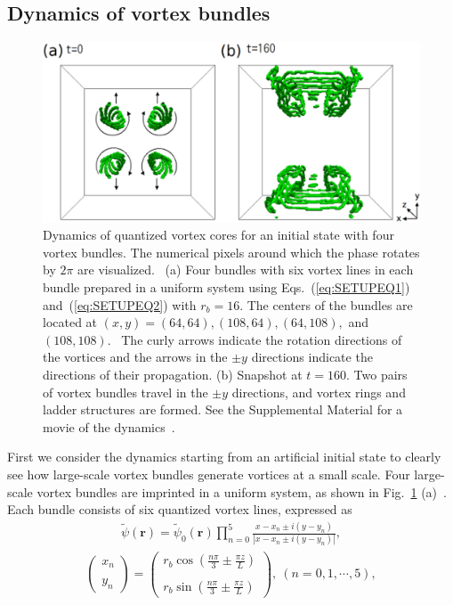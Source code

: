 \documentclass[aps,onecolumn,pra,longbibliography]{revtex4}
\begin{document}
	\subsection{Dynamics of vortex bundles}
	\label{s:nucleation}
	\begin{figure}[t]
		\centering
		\includegraphics[width=18cm]{FIG1.eps}
		\caption{
			Dynamics of quantized vortex cores for an initial state
			with four vortex bundles. The numerical pixels around which
			the phase rotates by $2\pi$ are visualized.
			\
			(a) Four bundles with six vortex lines in each bundle
			prepared in a uniform system using Eqs.~(\ref{eq:SETUPEQ1})
			and~(\ref{eq:SETUPEQ2}) with $r_b=16$. The centers of
			the bundles are located at
			$(x,y)=(64,64),(108,64),(64,108),$ and $(108,108)$.
			\
			The curly arrows indicate the rotation directions of the vortices
			and the arrows in the $\pm y$ directions indicate the directions of
			their propagation.
			(b) Snapshot at $t=160$. Two pairs of vortex bundles travel in the $\pm y$ directions,
			and vortex rings and ladder structures are formed.
			See the Supplemental Material for a movie of the dynamics~\cite{SM}.
		}
		\label{f:SETUP}
	\end{figure}
	First we consider the dynamics starting from an artificial initial state
	to clearly see how large-scale vortex bundles generate vortices at a small scale.
	Four large-scale vortex bundles are imprinted in a uniform system,
	as shown in Fig.~\ref{f:SETUP} (a)~\cite{T.Yasuda}.
	Each bundle consists of six quantized vortex lines, expressed as
	\begin{eqnarray}
		\label{eq:SETUPEQ1}
		\tilde{\psi}({\bm r}) =
		\tilde{\psi}_0({\bm r}) \prod_{n=0}^5
			\frac{x - x_n \pm i(y - y_n)}
			{|x - x_n \pm i(y - y_n)|},
	\end{eqnarray}
	\begin{eqnarray}
		\label{eq:SETUPEQ2}
		\left(
			\begin{array}{l}
				x_n
				\\
				\\
				y_n
			\end{array}
		\right) =
		\left(
			\begin{array}{l}
				r_b \cos \left( \frac{n \pi}{3} \pm \frac{\pi z}{L} \right)
				\\
				\\
				r_b \sin \left( \frac{n \pi}{3} \pm \frac{\pi z}{L} \right)
			\end{array}
		\right), \ (n=0, 1, \cdots, 5),
	\end{eqnarray}
\end{document}
